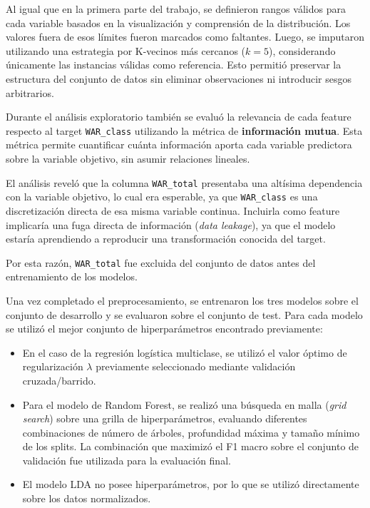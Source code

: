 \documentclass[11pt]{article}
\begin{document}
Al igual que en la primera parte del trabajo, se definieron rangos válidos para cada variable basados en la visualización y comprensión de la distribución. Los valores fuera de esos límites fueron marcados como faltantes. Luego, se imputaron utilizando una estrategia por K-vecinos más cercanos ($k=5$), considerando únicamente las instancias válidas como referencia. Esto permitió preservar la estructura del conjunto de datos sin eliminar observaciones ni introducir sesgos arbitrarios.

Durante el análisis exploratorio también se evaluó la relevancia de cada feature respecto al target \texttt{WAR\_class} utilizando la métrica de \textbf{información mutua}. Esta métrica permite cuantificar cuánta información aporta cada variable predictora sobre la variable objetivo, sin asumir relaciones lineales.

El análisis reveló que la columna \texttt{WAR\_total} presentaba una altísima dependencia con la variable objetivo, lo cual era esperable, ya que \texttt{WAR\_class} es una discretización directa de esa misma variable continua. Incluirla como feature implicaría una fuga directa de información (\textit{data leakage}), ya que el modelo estaría aprendiendo a reproducir una transformación conocida del target.

Por esta razón, \texttt{WAR\_total} fue excluida del conjunto de datos antes del entrenamiento de los modelos.

Una vez completado el preprocesamiento, se entrenaron los tres modelos sobre el conjunto de desarrollo y se evaluaron sobre el conjunto de test. Para cada modelo se utilizó el mejor conjunto de hiperparámetros encontrado previamente:

\begin{itemize}
    \item En el caso de la regresión logística multiclase, se utilizó el valor óptimo de regularización $\lambda$ previamente seleccionado mediante validación cruzada/barrido.
    \item Para el modelo de Random Forest, se realizó una búsqueda en malla (\textit{grid search}) sobre una grilla de hiperparámetros, evaluando diferentes combinaciones de número de árboles, profundidad máxima y tamaño mínimo de los splits. La combinación que maximizó el F1 macro sobre el conjunto de validación fue utilizada para la evaluación final.
    \item El modelo LDA no posee hiperparámetros, por lo que se utilizó directamente sobre los datos normalizados.
\end{itemize}
\end{document}
